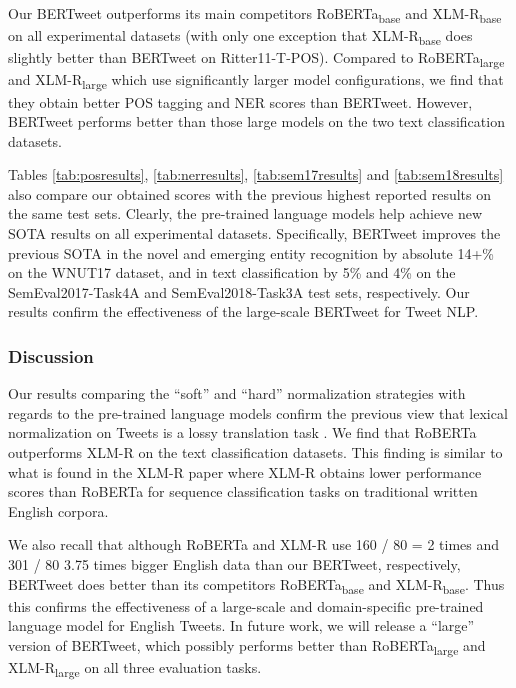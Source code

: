 \documentclass[11pt,a4paper]{article}
\begin{document}
Our BERTweet outperforms its main competitors RoBERTa\textsubscript{base}  and XLM-R\textsubscript{base} on all experimental datasets (with only one exception that XLM-R\textsubscript{base} does slightly better than BERTweet on Ritter11-T-POS). Compared to  RoBERTa\textsubscript{large}  and XLM-R\textsubscript{large} which use significantly larger model configurations, we find that they obtain better POS tagging and NER scores than BERTweet. However, BERTweet performs better than those large models on the two text classification datasets.

Tables \ref{tab:posresults}, \ref{tab:nerresults}, \ref{tab:sem17results} and \ref{tab:sem18results}  also compare our obtained scores with the previous highest reported results on the same test sets. Clearly, the pre-trained language models help achieve new SOTA results on all experimental datasets. Specifically, BERTweet improves the previous SOTA in the novel and emerging entity recognition by absolute 14+\% on the WNUT17 dataset, and in text classification  by 5\% and 4\%  on the SemEval2017-Task4A  and SemEval2018-Task3A  test sets, respectively. 
Our results confirm the effectiveness of the large-scale BERTweet for Tweet NLP.

\subsubsection*{Discussion}

Our results comparing the ``soft'' and ``hard'' normalization strategies with regards to the pre-trained language models confirm the previous view that lexical normalization on Tweets is a lossy translation task \cite{owoputi-etal-2013-improved}. 
We find that RoBERTa outperforms XLM-R on the text classification datasets. This finding is similar to what is found in the XLM-R paper \citep{conneau2019unsupervised} where XLM-R obtains lower performance scores than RoBERTa for sequence classification tasks on traditional written English corpora.
 
We also recall that although RoBERTa and XLM-R use 160 / 80 = 2 times and 301 / 80  3.75 times bigger English data than our BERTweet, respectively, BERTweet does better than its competitors RoBERTa\textsubscript{base} and XLM-R\textsubscript{base}. Thus this confirms the effectiveness of a large-scale and domain-specific pre-trained language model for English Tweets. In future work, we will release a ``large'' version of BERTweet, which possibly performs better than RoBERTa\textsubscript{large} and XLM-R\textsubscript{large} on all three evaluation tasks. 
\end{document}
